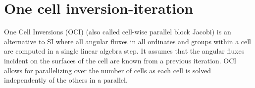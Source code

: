 


\section{One cell inversion-iteration}


One Cell Inversions (OCI) (also called cell-wise parallel block Jacobi) is an alternative to SI where all angular fluxes in all ordinates and groups within a cell are computed in a single linear algebra step.
It assumes that the angular fluxes incident on the surfaces of the cell are known from a previous iteration.
OCI allows for parallelizing over the number of cells as each cell is solved independently of the others in a parallel.

